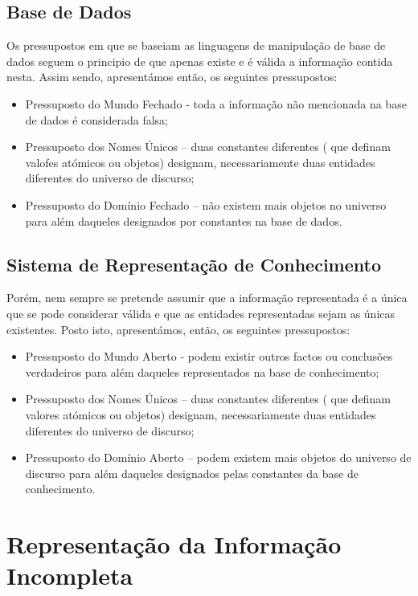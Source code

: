 \subsection{Base de Dados}
Os pressupostos em que se baseiam as linguagens de manipulação de base de dados seguem o principio de que apenas existe e é válida a informação contida nesta. Assim sendo, apresentámos
então, os seguintes pressupostos:

\begin{itemize}
	\item Pressuposto do Mundo Fechado - toda a informação não mencionada na base de dados é considerada falsa;
	\item Pressuposto dos Nomes Únicos – duas constantes diferentes ( que definam valofes atómicos ou objetos) designam, necessariamente duas entidades diferentes do universo de discurso; 
	\item Pressuposto do Domínio Fechado – não existem mais objetos no universo para além daqueles designados por constantes na base de dados.  
\end{itemize}

\subsection{Sistema de Representação de Conhecimento}


Porém, nem sempre se pretende assumir que a informação representada é a única que se pode
considerar válida e que as entidades representadas sejam as únicas existentes. Posto isto, apresentámos, então, os seguintes pressupostos:

\begin{itemize}
	\item Pressuposto do Mundo Aberto - podem existir outros factos ou conclusões verdadeiros para além daqueles representados na base de conhecimento; 
	\item Pressuposto dos Nomes Únicos – duas constantes diferentes ( que definam valores atómicos ou objetos) designam, necessariamente duas entidades diferentes do universo de discurso; 
	\item Pressuposto do Domínio Aberto – podem existem mais objetos do universo de discurso para além daqueles designados pelas constantes da base de conhecimento.  
\end{itemize}

\section{Representação da Informação Incompleta}



